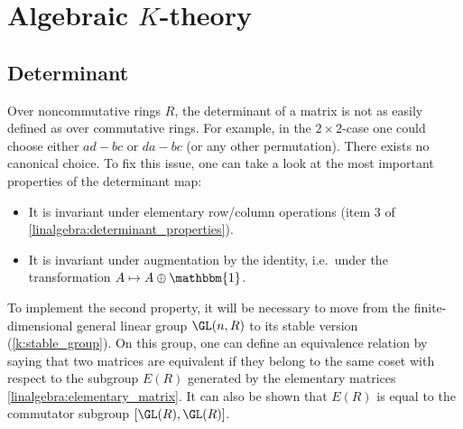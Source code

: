 

\section{\texorpdfstring{Algebraic $K$-theory}{Algebraic K-theory}}
\subsection{Determinant}

    Over noncommutative rings $R$, the determinant of a matrix is not as easily defined as over commutative rings. For example, in the $2\times2$-case one could choose either $ad-bc$ or $da-bc$ (or any other permutation). There exists no canonical choice. To fix this issue, one can take a look at the most important properties of the determinant map:
    \begin{itemize}
        \item It is invariant under elementary row/column operations (item 3 of \cref{linalgebra:determinant_properties}).
        \item It is invariant under augmentation by the identity, i.e.~under the transformation $A\mapsto A\oplus\mathbbm{1}$.
    \end{itemize}
    To implement the second property, it will be necessary to move from the finite-dimensional general linear group $\GL(n,R)$ to its stable version (\cref{k:stable_group}). On this group, one can define an equivalence relation by saying that two matrices are equivalent if they belong to the same coset with respect to the subgroup $E(R)$ generated by the elementary matrices \ref{linalgebra:elementary_matrix}. It can also be shown that $E(R)$ is equal to the commutator subgroup $[\GL(R),\GL(R)]$.

